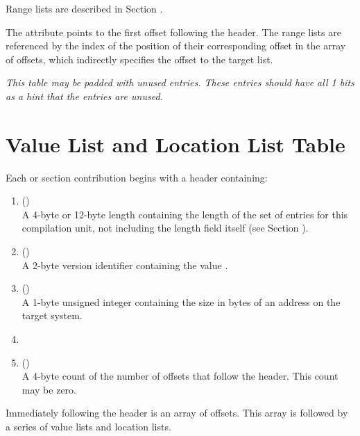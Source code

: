 Range lists are
described in Section .
\db

The \DWATrnglistsbase{} attribute points to the first offset 
following the header. The range lists are referenced
by the index of the position of their corresponding offset in the
array of offsets, which indirectly specifies the offset to the
target list.

\bb
\textit{This table may be padded with unused entries. 
These entries should have all 1 bits as a hint that the 
entries are unused.}
\eb


\bb
\section{Value List and Location List Table}
\label{datarep:locationlisttable}
Each \dotdebugloclists{} or \dotdebugloclistsdwo{} section
contribution
\eb
begins with a header containing:
\begin{enumerate}[1. ]
\item \HFNunitlength{} () \\
A 4-byte or 12-byte length containing the length of
the set of entries for this compilation unit, not
including the length field itself
\bb
(see Section ).
\eb

\item  \HFNversion{} (\HFTuhalf) \\
A 2-byte version identifier containing the value
\versiondotdebugloclists{}.

\item	\HFNaddresssize{} (\HFTubyte) \\
A 1-byte unsigned integer containing the size in
bytes of an address 
\db
on the target system.

\item	\HFNreservedwassegmentselectorsize{} 
\db
\\

\item   \HFNoffsetentrycount{} (\HFTuword) \\
A 4-byte count of the number of offsets
that follow the header. This count may be zero.
\end{enumerate}

Immediately following the header is an array of offsets.
This array is followed by a series of 
\bb
value lists and 
\eb
location lists. 

